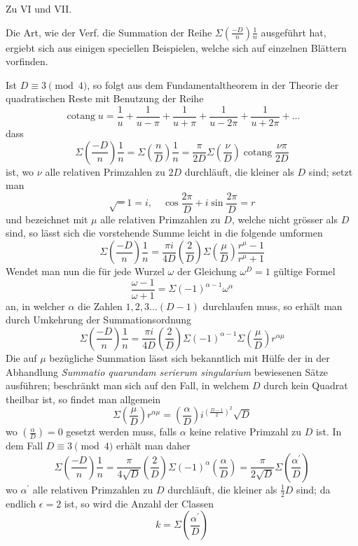 \begin{center}\large Zu VI und VII.\end{center}

Die Art, wie der Verf. die Summation der Reihe $\Sigma\left(\frac{-D}n\right)\frac1n$ ausgeführt hat, ergiebt sich aus einigen speciellen Beispielen, welche sich auf einzelnen Blättern vorfinden.

Ist $D\equiv3\pmod4$, so folgt aus dem Fundamentaltheorem in der Theorie der quadratischen Reste mit Benutzung der Reihe
\[
\operatorname{cotang}u=\frac1u+\frac1{u-\pi}+\frac1{u+\pi}+\frac1{u-2\pi}+\frac1{u+2\pi}+\ldots
\]
dass
\[
\Sigma\left(\frac{-D}n\right)\frac1n=\Sigma\left(\frac nD\right)\frac1n=\frac\pi{2D}\Sigma\left(\frac\nu D\right)\operatorname{cotang}\frac{\nu\pi}{2D}
\]
ist, wo $\nu$ alle relativen Primzahlen zu $2D$ durchläuft, die kleiner als $D$ sind; setzt man
\[
\surd-1=i,\quad\cos\frac{2\pi}D+i\sin\frac{2\pi}D=r
\]
und bezeichnet mit $\mu$ alle relativen Primzahlen zu $D$, welche nicht grösser als $D$ sind, so lässt sich die vorstehende Summe leicht in die folgende umformen
\[
\Sigma\left(\frac{-D}n\right)\frac1n=\frac{\pi i}{4D}\left(\frac2D\right)\Sigma\left(\frac\mu D\right)\frac{r^\mu-1}{r^\mu+1}
\]
Wendet man nun die für jede Wurzel $\omega$ der Gleichung $\omega^D=1$ gültige Formel
\[
\frac{\omega-1}{\omega+1}=\Sigma(-1)^{\alpha-1}\omega^\alpha
\]
an, in welcher $\alpha$ die Zahlen $1,2,3\ldots(D-1)$ durchlaufen muss, so erhält man durch Umkehrung der Summationsordnung
\[
\Sigma\left(\frac{-D}n\right)\frac1n=\frac{\pi i}{4D}\left(\frac2D\right)\Sigma(-1)^{\alpha-1}\Sigma\left(\frac\mu D\right)r^{\alpha\mu}
\]
Die auf $\mu$ bezügliche Summation lässt sich bekanntlich mit Hülfe der in der Abhandlung \emph{Summatio quarundam serierum singularium} bewiesenen Sätze ausführen; beschränkt man sich auf den Fall, in welchem $D$ durch kein Quadrat theilbar ist, so findet man allgemein
\[
\Sigma\left(\frac\mu D\right)r^{\alpha\mu}=\left(\frac\alpha D\right)i^{\left(\frac{D-1}2\right)^2}\surd D
\]
wo $\left(\frac\alpha D\right)=0$ gesetzt werden muss, falls $\alpha$ keine relative Primzahl zu $D$ ist. In dem Fall $D\equiv3\pmod4$ erhält man daher
\[
\Sigma\left(\frac{-D}n\right)\frac1n=\frac\pi{4\surd D}\left(\frac2D\right)\Sigma(-1)^\alpha\left(\frac\alpha D\right)=\frac\pi{2\surd D}\Sigma\left(\frac{\alpha^{\prime}}D\right)
\]
wo $\alpha^{\prime}$ alle relativen Primzahlen zu $D$ durchläuft, die kleiner als $\frac12D$ sind; da endlich $\epsilon=2$ ist, so wird die Anzahl der Classen
\[
k=\Sigma\left(\frac{\alpha^{\prime}}D\right)
\]

